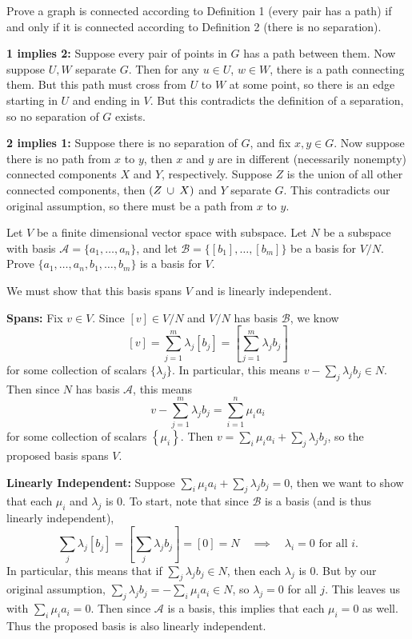 \documentclass[twoside,10pt]{article}
\begin{document}

\begin{exer}[]
	Prove a graph is connected according to Definition 1 (every pair has a path) if and only if it is connected according to Definition 2 (there is no separation).
\end{exer}

\textbf{1 implies 2:} Suppose every pair of points in $G$ has a path between them. Now suppose $U,W$ separate $G$. Then for any $u \in U$, $w \in W$, there is a path connecting them. But this path must cross from $U$ to $W$ at some point, so there is an edge starting in $U$ and ending in $V$. But this contradicts the definition of a separation, so no separation of $G$ exists.

\textbf{2 implies 1:} Suppose there is no separation of $G$, and fix $x,y \in G$. Now suppose there is no path from $x$ to $y$, then $x$ and $y$ are in different (necessarily nonempty) connected components $X$ and $Y$, respectively. Suppose $Z$ is the union of all other connected components, then $(Z \operatorname{\;\cup\;} X)$ and $Y$ separate $G$. This contradicts our original assumption, so there must be a path from $x$ to $y$.

\newpage

\begin{exer}[]
Let $V$ be a finite dimensional vector space with subspace. Let $N$ be a subspace with basis $\mathcal{A} = \{a_1, \dots, a_n\}$, and let $\mathcal{B} = \{[b_1], \dots, [b_m]\}$ be a basis for $V/N$. Prove $\{a_1, \dots, a_n, b_1, \dots, b_m\}$ is a basis for $V$.
\end{exer}

We must show that this basis spans $V$ and is linearly independent.

\textbf{Spans:} Fix $v \in V$. Since $[v] \in V/N$ and $V/N$ has basis $\mathcal{B}$, we know
\[
	[v] = \sum_{j=1}^{m} \lambda_{j}[b_{j}] = \left[ \sum_{j=1}^{m}\lambda_{j}b_{j} \right]
\] for some collection of scalars $\{\lambda_{j}\}$. In particular, this means $v - \sum_{j}\lambda_{j}b_{j} \in N$. Then since $N$ has basis $\mathcal{A}$, this means
\[
v - \sum_{j=1}^{m} \lambda_{j}b_{j} = \sum_{i=1}^{n} \mu_{i}a_{i}
\] for some collection of scalars $\left\{ \mu_{i} \right\}$. Then $v = \sum_{i}\mu_{i}a_{i} + \sum_{j}\lambda_{j}b_{j}$, so the proposed basis spans $V$.

\textbf{Linearly Independent:} Suppose $\sum_{i}\mu_{i}a_{i} + \sum_{j}\lambda_{j}b_{j} = 0$, then we want to show that each $\mu_{i}$ and $\lambda_{j}$ is 0. To start, note that since $\mathcal{B}$ is a basis (and is thus linearly independent),
\[
	\sum_{j}\lambda_{j}[b_{j}] = \left[ \sum_{j}\lambda_{j}b_{j} \right] = [0] = N \quad\implies \quad \lambda_i = 0 \text{ for all } i.
\] In particular, this means that if $\sum_{j}\lambda_{j}b_{j} \in N$, then each $\lambda_j$ is 0. But by our original assumption, $\sum_{j}\lambda_{j}b_{j} = - \sum_{i}\mu_{i}a_{i} \in N$, so $\lambda_{j}=0 $ for all $j$. This leaves us with $\sum_{i}\mu_{i}a_{i}=0$. Then since $\mathcal{A}$ is a basis, this implies that each $\mu_i=0$ as well. Thus the proposed basis is also linearly independent.

\newpage
\end{document}
